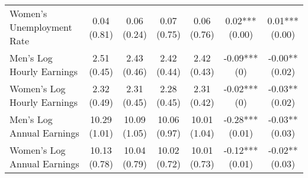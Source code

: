 \begin{landscape}
\begin{ThreePartTable}
\begin{longtable}[t]{>{\raggedright\arraybackslash}p{5cm}cccccc}
\addlinespace
\hspace{1em}Women’s Unemployment Rate & \specialcell{0.04\\(0.81)} & \specialcell{0.06\\(0.24)} & \specialcell{0.07\\(0.75)} & \specialcell{0.06\\(0.76)} & \specialcell{0.02***\\(0.00)} & \specialcell{0.01***\\(0.00)}\\
\hspace{1em}Men’s Log Hourly Earnings & \specialcell{2.51\\(0.45)} & \specialcell{2.43\\(0.46)} & \specialcell{2.42\\(0.44)} & \specialcell{2.42\\(0.43)} & \specialcell{-0.09***\\(0)} & \specialcell{-0.00**\\(0.02)}\\
\hspace{1em}Women’s Log Hourly Earnings & \specialcell{2.32\\(0.49)} & \specialcell{2.31\\(0.45)} & \specialcell{2.28\\(0.45)} & \specialcell{2.31\\(0.42)} & \specialcell{-0.02***\\(0)} & \specialcell{-0.03**\\(0.02)}\\
\hspace{1em}Men’s Log Annual Earnings & \specialcell{10.29\\(1.01)} & \specialcell{10.09\\(1.05)} & \specialcell{10.06\\(0.97)} & \specialcell{10.01\\(1.04)} & \specialcell{-0.28***\\(0.01)} & \specialcell{-0.03**\\(0.03)}\\
\hspace{1em}Women’s Log Annual Earnings & \specialcell{10.13\\(0.78)} & \specialcell{10.04\\(0.79)} & \specialcell{10.02\\(0.72)} & \specialcell{10.01\\(0.73)} & \specialcell{-0.12***\\(0.01)} & \specialcell{-0.02**\\(0.03)}\\*
\end{longtable}
\end{ThreePartTable}
\end{landscape}
